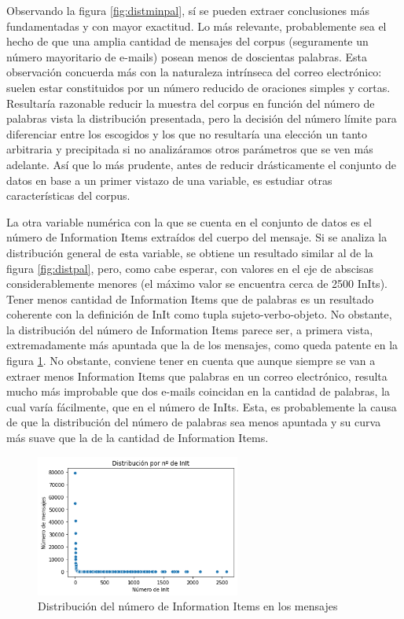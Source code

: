 Observando la figura \ref{fig:distminpal}, sí se pueden extraer conclusiones más fundamentadas y con mayor exactitud. Lo más relevante, probablemente sea el hecho de que una amplia cantidad de mensajes del corpus (seguramente un número mayoritario de e-mails) posean menos de doscientas palabras. Esta observación concuerda más con la naturaleza intrínseca del correo electrónico: suelen estar constituidos por un número reducido de oraciones simples y cortas. Resultaría razonable reducir la muestra del corpus en función del número de palabras vista la distribución presentada, pero la decisión del número límite para diferenciar entre los escogidos y los que no resultaría una elección un tanto arbitraria y precipitada si no analizáramos otros parámetros que se ven más adelante. Así que lo más prudente, antes de reducir drásticamente el conjunto de datos en base a un primer vistazo de una variable, es estudiar otras características del corpus.

La otra variable numérica con la que se cuenta en el conjunto de datos es el número de Information Items extraídos del cuerpo del mensaje. Si se analiza la distribución general de esta variable, se obtiene un resultado similar al de la figura \ref{fig:distpal}, pero, como cabe esperar, con valores en el eje de abscisas considerablemente menores (el máximo valor se encuentra cerca de 2500 InIts). Tener menos cantidad de Information Items que de palabras es un resultado coherente con la definición de InIt como tupla sujeto-verbo-objeto. No obstante, la distribución del número de Information Items parece ser, a primera vista, extremadamente más apuntada que la de los mensajes, como queda patente en la figura \ref{fig:distinit}. No obstante, conviene tener en cuenta que aunque siempre se van a extraer menos Information Items que palabras en un correo electrónico, resulta mucho más improbable que dos e-mails coincidan en la cantidad de palabras, la cual varía fácilmente, que en el número de InIts. Esta, es probablemente la causa de que la distribución del número de palabras sea menos apuntada y su curva más suave que la de la cantidad de Information Items.

\begin{figure}[h]
	\centering%
	\centerline{\includegraphics[width = 0.6\textwidth]{Imagenes/Bitmap/distinits.png}}%
	\caption{Distribución del número de Information Items en los mensajes}%
	\label{fig:distinit}
\end{figure}

